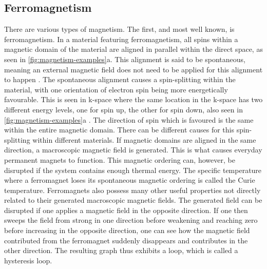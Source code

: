     \subsection{Ferromagnetism}
    There are various types of magnetism. The first, and most well known, is ferromagnetism. In a material featuring ferromagnetism, all spins within a 
    magnetic domain of the material are aligned in parallel within the direct space, as seen in \autoref{fig:magnetism-examples}a. This alignment is 
    said to be spontaneous, meaning an external magnetic field does not need to be applied for this alignment to happen \cite{mugiraneza2022tutorial}. 
    The spontaneous alignment causes a spin-splitting within the material, with one orientation of electron spin being more energetically favourable. 
    This is seen in k-space where the same location in the k-space has two different energy levels, one for spin up, the other for spin down, also seen 
    in \autoref{fig:magnetism-examples}a \cite{song2025altermagnets}. The direction of spin which is favoured is the same within the entire magnetic 
    domain. There can be different causes for this spin-splitting within different materials. If magnetic domains are aligned in the same direction, a 
    macroscopic magnetic field is generated. This is what causes everyday permanent magnets to function. This magnetic ordering can, however, be 
    disrupted if the system contains enough thermal energy. The specific temperature where a ferromagnet loses its spontaneous magnetic ordering is 
    called the Curie temperature. Ferromagnets also possess many other useful properties not directly related to their generated macroscopic magnetic 
    fields. The generated field can be disrupted if one applies a magnetic field in the opposite direction. If one then sweeps the field from strong in 
    one direction before weakening and reaching zero before increasing in the opposite direction, one can see how the magnetic field contributed from 
    the ferromagnet suddenly disappears and contributes in the other direction. The resulting graph thus exhibits a loop, which is called a hysteresis 
    loop. \cite{mugiraneza2022tutorial}
